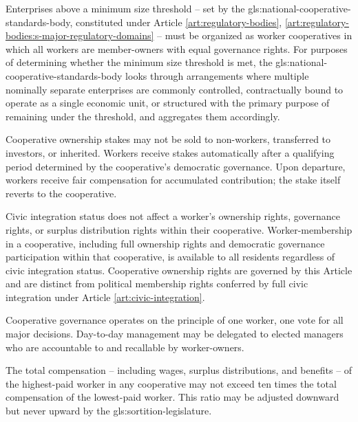
Enterprises above a minimum size threshold -- set by the \gls{gls:national-cooperative-standards-body}, constituted under Article \ref{art:regulatory-bodies}, \ref{art:regulatory-bodies:s-major-regulatory-domains} -- must be organized as worker cooperatives in which all workers are member-owners with equal governance rights. For purposes of determining whether the minimum size threshold is met, the \gls{gls:national-cooperative-standards-body} looks through arrangements where multiple nominally separate enterprises are commonly controlled, contractually bound to operate as a single economic unit, or structured with the primary purpose of remaining under the threshold, and aggregates them accordingly.

Cooperative ownership stakes may not be sold to non-workers, transferred to investors, or inherited. Workers receive stakes automatically after a qualifying period determined by the cooperative's democratic governance. Upon departure, workers receive fair compensation for accumulated contribution; the stake itself reverts to the cooperative.

Civic integration status does not affect a worker's ownership rights, governance rights, or surplus distribution rights within their cooperative. Worker-membership in a cooperative, including full ownership rights and democratic governance participation within that cooperative, is available to all residents regardless of civic integration status. Cooperative ownership rights are governed by this Article and are distinct from political membership rights conferred by full civic integration under Article \ref{art:civic-integration}.

Cooperative governance operates on the principle of one worker, one vote for all major decisions. Day-to-day management may be delegated to elected managers who are accountable to and recallable by worker-owners.

The total compensation -- including wages, surplus distributions, and benefits -- of the highest-paid worker in any cooperative may not exceed ten times the total compensation of the lowest-paid worker. This ratio may be adjusted downward but never upward by the \gls{gls:sortition-legislature}.

